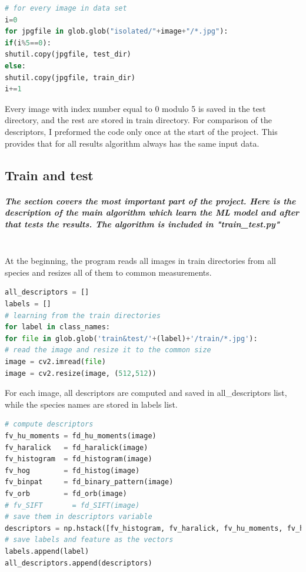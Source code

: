 \documentclass[12pt]{article}
\begin{document}
\begin{lstlisting}[language=Python]
# for every image in data set
i=0
for jpgfile in glob.glob("isolated/"+image+"/*.jpg"):
if(i%5==0):
shutil.copy(jpgfile, test_dir)
else:
shutil.copy(jpgfile, train_dir)
i+=1
\end{lstlisting}

Every image with index number equal to 0 modulo 5  is saved in the test directory, and the rest are stored in train directory.
For comparison of the descriptors, I preformed the code only once at the start of the project. This provides that for all results algorithm always has the same input data.

\newpage

\subsection{Train and test}

\subparagraph{
The section covers the most important part of the project. Here is the description of the main algorithm which learn the ML model and after that tests the results. The algorithm is included in "train\_test.py" \\\\
}

At the beginning, the program reads all images in train directories from all species and resizes all of them to common measurements.

\begin{lstlisting}[language=Python]
all_descriptors = []
labels = []
# learning from the train directories
for label in class_names:
for file in glob.glob('train&test/'+(label)+'/train/*.jpg'):
# read the image and resize it to the common size
image = cv2.imread(file)
image = cv2.resize(image, (512,512))
\end{lstlisting}

For each image, all descriptors are computed and saved in all\_descriptors list, while the species names are stored in labels list.

\begin{lstlisting}[language=Python]
# compute descriptors
fv_hu_moments = fd_hu_moments(image)
fv_haralick   = fd_haralick(image)
fv_histogram  = fd_histogram(image)
fv_hog        = fd_histog(image)
fv_binpat     = fd_binary_pattern(image)
fv_orb        = fd_orb(image)
# fv_SIFT       = fd_SIFT(image)  
# save them in descriptors variable
descriptors = np.hstack([fv_histogram, fv_haralick, fv_hu_moments, fv_hog, fv_binpat, fv_orb])
# save labels and feature as the vectors
labels.append(label)
all_descriptors.append(descriptors)
\end{lstlisting}
\end{document}
